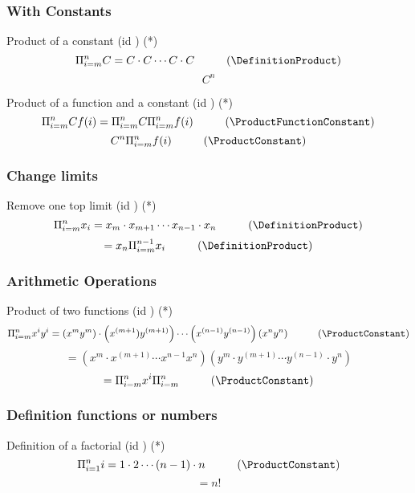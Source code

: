 \documentclass{book}
\begin{document}
                \subsubsection{With Constants}
                    Product of a constant (id \ProductConstant) (*)
                    \[\Pi^n_{i=m} C = C \cdot C \cdots C \cdot C \hspace{1cm} (\DefinitionProduct)\]
                    \[C^n\]

                    Product of a function and a constant (id \ProductFunctionConstant) (*)
                    \[\Pi^n_{i=m} C f(i) = \Pi^n_{i=m} C \Pi^n_{i=m} f(i) \hspace{1cm} (\ProductFunctionConstant)\]
                    \[C^n \Pi^n_{i=m} f(i) \hspace{1cm} (\ProductConstant)\]

                \subsubsection{Change limits}
                    Remove one top limit (id \RemoveOneTopLimit) (*)
                    \[\Pi^n_{i=m}x_i = x_m \cdot x_{m + 1} \cdots x_{n - 1} \cdot x_n \hspace{1cm} (\DefinitionProduct)\]
                    \[= x_n \Pi^{n - 1}_{i=m} x_i \hspace{1cm} (\DefinitionProduct)\]

                \subsubsection{Arithmetic Operations}
                    Product of two functions (id \ProductFunctions) (*)
                    \[\Pi^n_{i=m} x^i y^i = \left(x^m y^m\right) \cdot \left(x^{(m + 1}) y^{(m + 1)}\right) \cdots \left(x^{(n - 1)} y^{(n - 1)}\right) \left(x^n y^n\right) \hspace{1cm} (\ProductConstant)\]
                    \[= \left(x^{m} \cdot x^{(m + 1)} \cdots x^{n - 1} x^n\right) \left(y^m \cdot y^{(m + 1)} \cdots y^(n - 1) \cdot y^n\right)\]
                    \[= \Pi^n_{i=m} x^i \Pi^n_{i=m} \hspace{1cm} (\ProductConstant)\]

                \subsubsection{Definition functions or numbers}
                    Definition of a factorial (id \DefinitionFactorial) (*)
                    \[\Pi^n_{i=1} i = 1 \cdot 2 \cdots (n - 1) \cdot n \hspace{1cm} (\ProductConstant)\]
                    \[= n!\]
\end{document}

